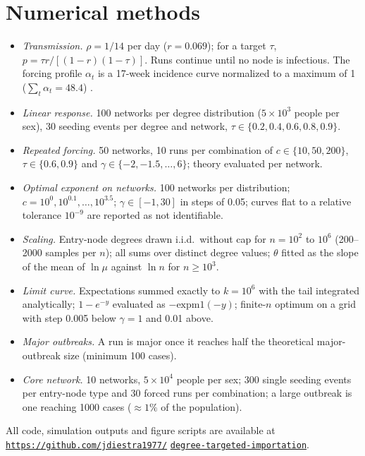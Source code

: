 \documentclass[pre,onecolumn,superscriptaddress,amsmath,amssymb,floatfix]{revtex4-2}
\theoremstyle{definition}
\theoremstyle{remark}
\begin{document}
\section{Numerical methods}
\begin{itemize}
\item \emph{Transmission.} $\rho=1/14$ per day ($r=0.069$); for a target $\tau$,
$p=\tau r/[(1-r)(1-\tau)]$. Runs continue until no node is infectious. The forcing
profile $\alpha_t$ is a 17-week incidence curve normalized to a maximum of 1
($\sum_t\alpha_t=48.4$) \cite{nycdohmh2022mpox}.
\item \emph{Linear response.} 100 networks per degree distribution
($5\times10^3$ people per sex), 30 seeding events per degree and network,
$\tau\in\{0.2,0.4,0.6,0.8,0.9\}$.
\item \emph{Repeated forcing.} 50 networks, 10 runs per combination of
$c\in\{10,50,200\}$, $\tau\in\{0.6,0.9\}$ and $\gamma\in\{-2,-1.5,\dots,6\}$; theory evaluated per network.
\item \emph{Optimal exponent on networks.} 100 networks per distribution;
$c=10^{0},10^{0.1},\dots,10^{3.5}$; $\gamma\in[-1,30]$ in steps of 0.05; curves flat to a
relative tolerance $10^{-9}$ are reported as not identifiable.
\item \emph{Scaling.} Entry-node degrees drawn i.i.d.\ without cap for $n=10^2$
to $10^6$ (200--2000 samples per $n$); all sums over distinct degree values;
$\theta$ fitted as the slope of the mean of $\ln\mu$ against $\ln n$ for $n\ge10^3$.
\item \emph{Limit curve.} Expectations summed exactly to $k=10^6$ with the tail
integrated analytically; $1-e^{-y}$ evaluated as $-\mathrm{expm1}(-y)$; finite-$n$
optimum on a grid with step 0.005 below $\gamma=1$ and 0.01 above.
\item \emph{Major outbreaks.} A run is major once it reaches half the
theoretical major-outbreak size (minimum 100 cases).
\item \emph{Core network.} 10 networks, $5\times10^4$ people per sex; 300 single
seeding events per entry-node type and 30 forced runs per combination; a
large outbreak is one reaching 1000 cases ($\approx1\%$ of the population).
\end{itemize}
All code, simulation outputs and figure scripts are available at
\href{https://github.com/jdiestra1977/degree-targeted-importation}{\mbox{\nolinkurl{https://github.com/jdiestra1977/}}}\hfil{}\hfilneg
\href{https://github.com/jdiestra1977/degree-targeted-importation}{\mbox{\nolinkurl{degree-targeted-importation}}}.


\end{document}
